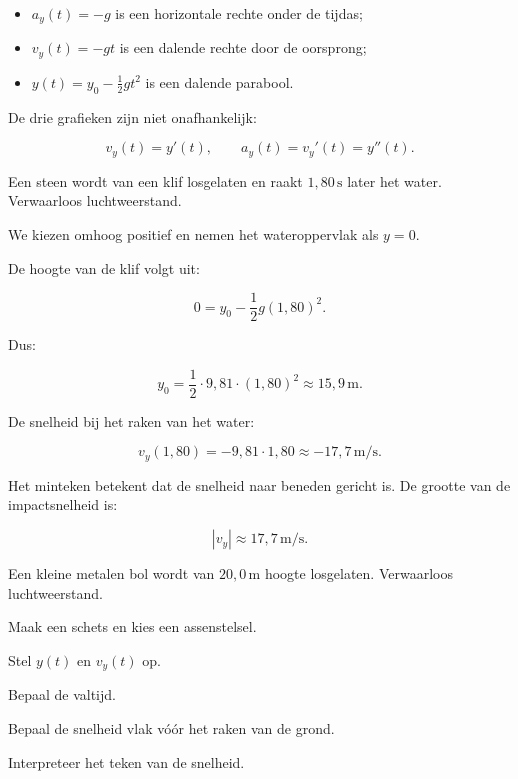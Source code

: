 \documentclass{ximera}
\begin{document}
\begin{itemize}
  \item $a_y(t)=-g$ is een horizontale rechte onder de tijdas;
  \item $v_y(t)=-gt$ is een dalende rechte door de oorsprong;
  \item $y(t)=y_0-\frac12gt^2$ is een dalende parabool.
\end{itemize}

De drie grafieken zijn niet onafhankelijk:

\[
\boxed{
v_y(t)=y'(t),
\qquad
a_y(t)=v_y'(t)=y''(t).
}
\]


\begin{voorbeeld}

Een steen wordt van een klif losgelaten en raakt
$1,80\,\mathrm{s}$ later het water. Verwaarloos luchtweerstand.

We kiezen omhoog positief en nemen het wateroppervlak als $y=0$.

De hoogte van de klif volgt uit:

\[
0=y_0-\frac12g(1,80)^2.
\]

Dus:

\[
y_0
=
\frac12\cdot9,81\cdot(1,80)^2
\approx15,9\,\mathrm{m}.
\]

De snelheid bij het raken van het water:

\[
v_y(1,80)
=
-9,81\cdot1,80
\approx-17,7\,\mathrm{m/s}.
\]

Het minteken betekent dat de snelheid naar beneden gericht is.
De grootte van de impactsnelheid is:

\[
\boxed{|v_y|\approx17,7\,\mathrm{m/s}.}
\]

\end{voorbeeld}


\begin{oefening}{\oefB\ESS}

Een kleine metalen bol wordt van $20,0\,\mathrm{m}$ hoogte losgelaten.
Verwaarloos luchtweerstand.

\begin{question}
Maak een schets en kies een assenstelsel.
\end{question}

\begin{question}
Stel $y(t)$ en $v_y(t)$ op.
\end{question}

\begin{question}
Bepaal de valtijd.
\end{question}

\begin{question}
Bepaal de snelheid vlak vóór het raken van de grond.
\end{question}

\begin{question}
Interpreteer het teken van de snelheid.
\end{question}

\end{oefening}
\end{document}

